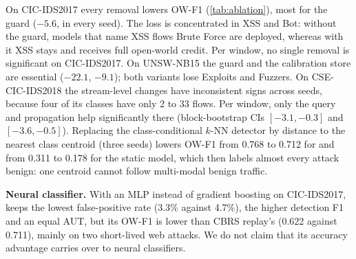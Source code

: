 On CIC-IDS2017 every removal lowers OW-F1 (\cref{tab:ablation}), most for the guard ($-5.6$, in every seed). The
loss is concentrated in XSS and Bot: without the guard, models that name XSS flows Brute Force are deployed, whereas
with it XSS stays \unk{} and receives full open-world credit. Per window, no single removal is significant on
CIC-IDS2017. On UNSW-NB15 the guard and the calibration store are essential ($-22.1$, $-9.1$); both variants lose
Exploits and Fuzzers. On CSE-CIC-IDS2018 the stream-level changes have inconsistent signs across seeds, because four
of its classes have only 2 to 33 flows. Per window, only the query and propagation help significantly there
(block-bootstrap CIs $[-3.1, -0.3]$ and $[-3.6, -0.5]$). Replacing the class-conditional $k$-NN detector by
distance to the nearest class centroid (three seeds) lowers OW-F1 from 0.768 to 0.712 for \nova{} and from 0.311
to 0.178 for the static model, which then labels almost every attack benign: one centroid cannot follow multi-modal benign
traffic.

\textbf{Neural classifier.} With an MLP instead of gradient boosting on CIC-IDS2017, \nova{} keeps the lowest
false-positive rate (3.3\% against 4.7\%), the higher detection F1 and an equal AUT, but its OW-F1 is lower than
CBRS replay's (0.622 against 0.711), mainly on two short-lived web attacks. We do not claim that its accuracy
advantage carries over to neural classifiers.
